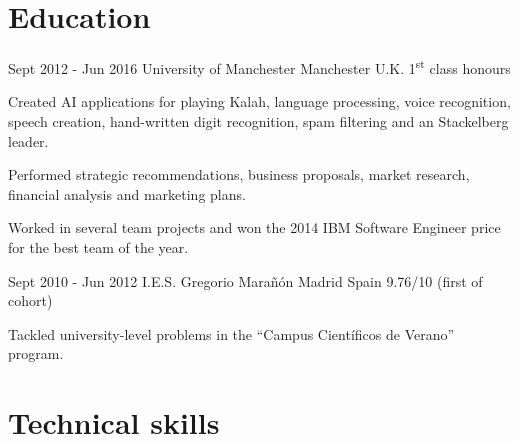 \documentclass[10pt]{CurriculumVitae}
\begin{document}
  \section{Education}
   
      {Sept 2012 - Jun 2016}
      {University of Manchester}
      {Manchester}
      {U.K.}
      {1\textsuperscript{st} class honours}
      {
        \item Created AI applications for playing Kalah, language processing, voice recognition, speech creation, 
        hand-written digit recognition, spam filtering and an Stackelberg leader.
        \item Performed strategic recommendations, business proposals, market research, financial analysis and marketing plans.
         \item Worked in several team projects and won the 2014 IBM Software Engineer price for the best team of the year.
      }

      {Sept 2010 - Jun 2012}
      {I.E.S. Gregorio Marañón}
      {Madrid}
      {Spain}
      {9.76/10 (first of cohort)}
      {
        \item Tackled university-level problems in the ``Campus Científicos de Verano'' program.
      }


  \section{Technical skills}
    
\end{document}
